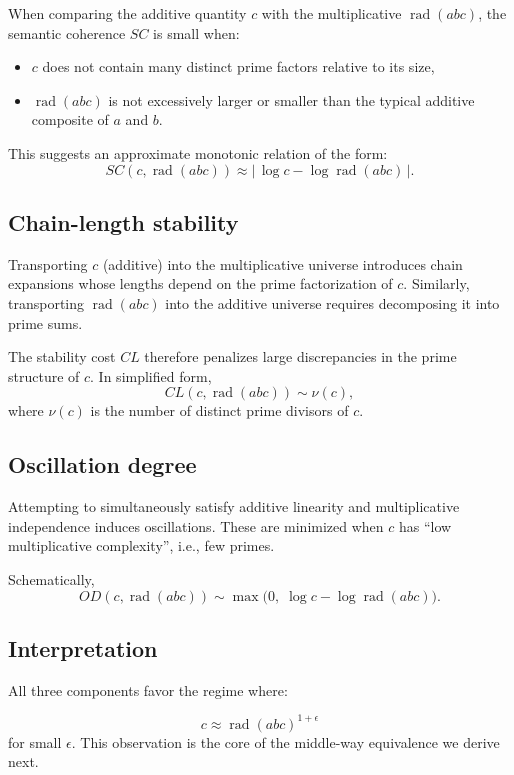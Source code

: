 \documentclass[11pt]{article}
\theoremstyle{definition}
\theoremstyle{remark}
\begin{document}
When comparing the additive quantity $c$ with the multiplicative
$\operatorname{rad}(abc)$, the semantic coherence $SC$ is small when:

\begin{itemize}
  \item $c$ does not contain many distinct prime factors relative to
        its size,
  \item $\operatorname{rad}(abc)$ is not excessively larger or smaller
        than the typical additive composite of $a$ and $b$.
\end{itemize}

This suggests an approximate monotonic relation of the form:
\[
  SC(c, \operatorname{rad}(abc)) \approx |\, \log c - \log \operatorname{rad}(abc) \,|.
\]

\subsection{Chain-length stability}

Transporting $c$ (additive) into the multiplicative universe introduces
chain expansions whose lengths depend on the prime factorization of $c$.
Similarly, transporting $\operatorname{rad}(abc)$ into the additive
universe requires decomposing it into prime sums.

The stability cost $CL$ therefore penalizes large discrepancies in the
prime structure of $c$. In simplified form,
\[
  CL(c, \operatorname{rad}(abc)) \sim \nu(c),
\]
where $\nu(c)$ is the number of distinct prime divisors of $c$.

\subsection{Oscillation degree}

Attempting to simultaneously satisfy additive linearity and
multiplicative independence induces oscillations. These are minimized
when $c$ has ``low multiplicative complexity'', i.e., few primes.

Schematically,
\[
  OD(c, \operatorname{rad}(abc))
     \sim \max\bigl( 0,\; \log c - \log \operatorname{rad}(abc) \bigr).
\]

\subsection{Interpretation}

All three components favor the regime where:

\[
  c \approx \operatorname{rad}(abc)^{1+\epsilon}
\]
for small $\epsilon$. This observation is the core of the
middle-way equivalence we derive next.
\end{document}
